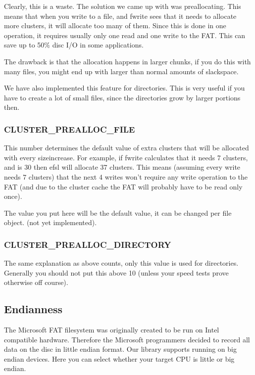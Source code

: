 Clearly, this is a waste. The solution we came up with was preallocating. This means
that when you write to a file, and fwrite sees that it needs to allocate more clusters,
it will allocate too many of them. Since this is done in one operation, it requires
usually only one read and one write to the FAT. This can save up to 50\% disc I/O
in some applications.

The drawback is that the allocation happens in larger chunks, if you do this with
many files, you might end up with larger than normal amounts of slackspace.

We have also implemented this feature for directories. This is very useful if you
have to create a lot of small files, since the directories grow by larger portions
then.

\subsubsection*{CLUSTER\_PREALLOC\_FILE}
This number determines the default value of extra clusters that will be allocated
with every sizeincrease. For example, if fwrite calculates that it needs 7 clusters,
and  is 30 then efsl will allocate 37 clusters.
This means (assuming every write needs 7 clusters) that the next 4 writes won't
require any write operation to the FAT (and due to the cluster cache the FAT will probably have to be read only once).

The value you put here will be the default value, it can be changed per file
object. (not yet implemented).

\subsubsection*{CLUSTER\_PREALLOC\_DIRECTORY}
The same explanation as above counts, only this value is used for directories.
Generally you should not put this above 10 (unless your speed tests prove otherwise
off course).

\subsection{Endianness}
The Microsoft FAT filesystem was originally created to be run on Intel compatible hardware.
Therefore the Microsoft programmers decided to record all data on the disc in little endian
format. Our library supports running on big endian devices. Here you can select whether your
target CPU is little or big endian.

